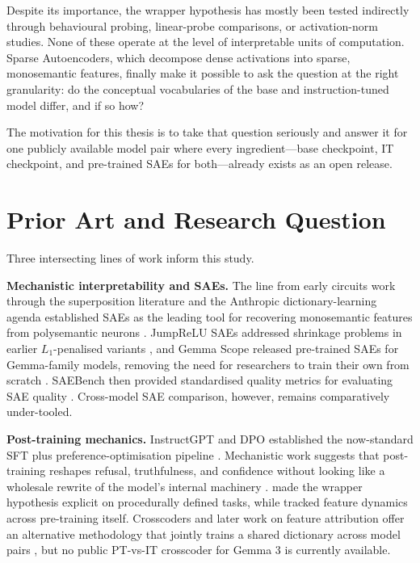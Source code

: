 Despite its importance, the wrapper hypothesis has mostly been tested indirectly through behavioural probing, linear-probe comparisons, or activation-norm studies. None of these operate at the level of interpretable units of computation. Sparse Autoencoders, which decompose dense activations into sparse, monosemantic features, finally make it possible to ask the question at the right granularity: do the conceptual vocabularies of the base and instruction-tuned model differ, and if so how?

The motivation for this thesis is to take that question seriously and answer it for one publicly available model pair where every ingredient---base checkpoint, IT checkpoint, and pre-trained SAEs for both---already exists as an open release.

\section{Prior Art and Research Question}
\label{sec:prior-art}

Three intersecting lines of work inform this study.

\textbf{Mechanistic interpretability and SAEs.} The line from early circuits work through the superposition literature and the Anthropic dictionary-learning agenda established SAEs as the leading tool for recovering monosemantic features from polysemantic neurons \parencite{elhage_toy_2022, bricken_monosemanticity_2023}. JumpReLU SAEs addressed shrinkage problems in earlier $L_1$-penalised variants \parencite{rajamanoharan_improving_2024}, and Gemma Scope released pre-trained SAEs for Gemma-family models, removing the need for researchers to train their own from scratch \parencite{lieberum_gemma_2024}. SAEBench then provided standardised quality metrics for evaluating SAE quality \parencite{karvonen_saebench_2025}. Cross-model SAE comparison, however, remains comparatively under-tooled.

\textbf{Post-training mechanics.} InstructGPT and DPO established the now-standard SFT plus preference-optimisation pipeline \parencite{ouyang_training_2022, rafailov_direct_2024}. Mechanistic work suggests that post-training reshapes refusal, truthfulness, and confidence without looking like a wholesale rewrite of the model's internal machinery \parencite{du_how_2025}. \textcite{jain_mechanistically_2024} made the wrapper hypothesis explicit on procedurally defined tasks, while \textcite{xu_tracking_nodate} tracked feature dynamics across pre-training itself. Crosscoders and later work on feature attribution offer an alternative methodology that jointly trains a shared dictionary across model pairs \parencite{lindsey_crosscoders_2024, minder_crosscoder_2025}, but no public PT-vs-IT crosscoder for Gemma 3 is currently available.

